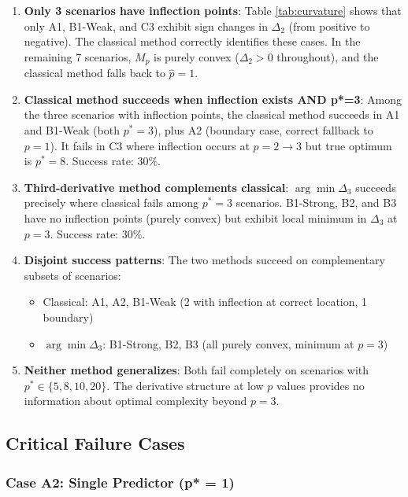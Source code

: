 \documentclass[11pt,a4paper]{article}
\begin{document}
\begin{enumerate}
\item \textbf{Only 3 scenarios have inflection points}: Table \ref{tab:curvature} shows that only A1, B1-Weak, and C3 exhibit sign changes in $\Delta_2$ (from positive to negative). The classical method correctly identifies these cases. In the remaining 7 scenarios, $M_p$ is purely convex ($\Delta_2 > 0$ throughout), and the classical method falls back to $\hat{p} = 1$.

\item \textbf{Classical method succeeds when inflection exists AND p*=3}: Among the three scenarios with inflection points, the classical method succeeds in A1 and B1-Weak (both $p^* = 3$), plus A2 (boundary case, correct fallback to $p=1$). It fails in C3 where inflection occurs at $p = 2 \to 3$ but true optimum is $p^* = 8$. Success rate: 30\%.

\item \textbf{Third-derivative method complements classical}: $\arg\min \Delta_3$ succeeds precisely where classical fails among $p^* = 3$ scenarios. B1-Strong, B2, and B3 have no inflection points (purely convex) but exhibit local minimum in $\Delta_3$ at $p = 3$. Success rate: 30\%.

\item \textbf{Disjoint success patterns}: The two methods succeed on complementary subsets of scenarios:
\begin{itemize}
\item Classical: A1, A2, B1-Weak (2 with inflection at correct location, 1 boundary)
\item $\arg\min \Delta_3$: B1-Strong, B2, B3 (all purely convex, minimum at $p=3$)
\end{itemize}

\item \textbf{Neither method generalizes}: Both fail completely on scenarios with $p^* \in \{5, 8, 10, 20\}$. The derivative structure at low $p$ values provides no information about optimal complexity beyond $p = 3$.
\end{enumerate}

\subsection{Critical Failure Cases}

\subsubsection{Case A2: Single Predictor (p* = 1)}
\end{document}
